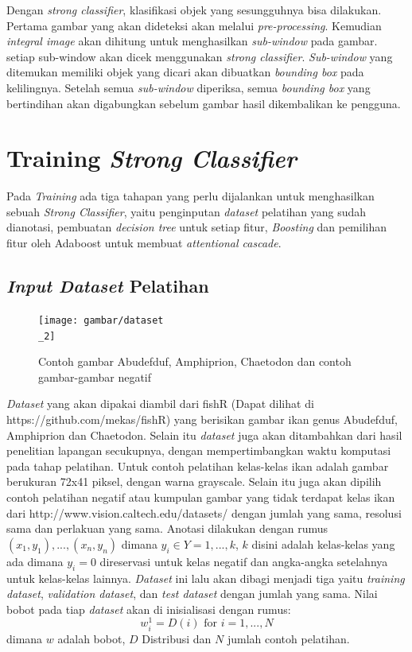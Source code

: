Dengan \emph{strong classifier}, klasifikasi objek yang sesungguhnya bisa dilakukan. 
Pertama gambar yang akan dideteksi akan melalui \emph{pre-processing}. 
Kemudian \emph{integral image} akan dihitung untuk 
menghasilkan \emph{sub-window} pada gambar. setiap sub-window akan dicek menggunakan 
\emph{strong classifier}. \emph{Sub-window} yang ditemukan memiliki objek yang 
dicari akan dibuatkan \emph{bounding box} pada kelilingnya. Setelah semua 
\emph{sub-window} diperiksa, semua \emph{bounding box} yang bertindihan akan 
digabungkan sebelum gambar hasil dikembalikan ke pengguna.

\section{Training \emph{Strong Classifier}}

Pada \textit{Training} ada tiga tahapan yang perlu dijalankan 
untuk menghasilkan sebuah \emph{Strong Classifier}, 
yaitu penginputan \textit{dataset} pelatihan yang sudah dianotasi, 
pembuatan \emph{decision tree} untuk setiap fitur, 
\emph{Boosting }dan pemilihan fitur oleh Adaboost untuk membuat \emph{attentional cascade}.

\subsection{\textit{Input Dataset} Pelatihan}

\begin{figure}[H]
  \centering{}
	\texttt{[image: gambar/dataset\\\_2]}
  \caption{Contoh gambar Abudefduf, Amphiprion, Chaetodon dan contoh gambar-gambar negatif}
\end{figure}

\textit{Dataset} yang akan dipakai diambil dari fishR (Dapat dilihat di https://github.com/mekas/fishR) yang 
berisikan gambar ikan genus Abudefduf, Amphiprion dan Chaetodon. Selain itu 
\textit{dataset} juga akan ditambahkan dari hasil penelitian lapangan 
secukupnya, dengan mempertimbangkan waktu komputasi pada tahap 
pelatihan.
Untuk contoh pelatihan kelas-kelas ikan adalah gambar berukuran 72x41 piksel, 
dengan warna grayscale. Selain itu juga akan dipilih contoh 
pelatihan negatif atau kumpulan gambar yang tidak terdapat kelas 
ikan dari http://www.vision.caltech.edu/datasets/ dengan jumlah yang sama, resolusi sama dan perlakuan 
yang sama. Anotasi dilakukan dengan rumus $(x_1, y_1),...,(x_n, y_n)$ dimana 
$y_i \in Y = {1,...,k}$, $k$ disini adalah kelas-kelas yang ada dimana $y_i = 0$ 
direservasi untuk kelas negatif dan angka-angka setelahnya untuk kelas-kelas lainnya.
\textit{Dataset} ini lalu 
akan dibagi menjadi tiga yaitu \textit{training dataset}, 
\textit{validation dataset}, dan \emph{test dataset} dengan jumlah yang sama.
Nilai bobot pada tiap \textit{dataset} akan di inisialisasi dengan rumus:
\begin{equation}
  w^1_i = D(i) \text{ for } i=1,...,N
\end{equation}
dimana $w$ adalah bobot, $D$ Distribusi dan $N$ jumlah contoh pelatihan.

